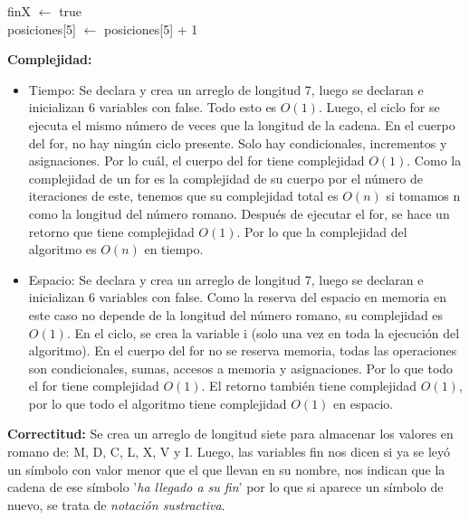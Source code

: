 \documentclass[12pt]{article}
\begin{document}
\begin{itemize}
\begin{algorithm}[H]
{{{{                }{
                    finX $\gets$ true \\
                    posiciones[5] $\gets$ posiciones[5] + 1 \\
                }
            }
        }
    }
    \end{algorithm}
    \textbf{Complejidad:}
    \begin{itemize}
        \item Tiempo: Se declara y crea un arreglo de longitud 7, luego se declaran e inicializan 6 variables con false. Todo esto es $O(1)$.
        Luego, el ciclo for se ejecuta el mismo número de veces que
        la longitud de la cadena. En el cuerpo del for, no hay ningún ciclo presente. Solo hay condicionales, incrementos y asignaciones. Por lo cuál, el cuerpo del for tiene complejidad $O(1)$. Como la complejidad de un for es la complejidad de su cuerpo por el número de iteraciones de este, tenemos que su complejidad total es $O(n)$ si tomamos n como la longitud del número romano. Después de ejecutar el for, se hace un retorno que tiene complejidad $O(1)$. Por lo que la complejidad del algoritmo es $O(n)$ en tiempo.
        \item Espacio: Se declara y crea un arreglo de longitud 7, luego se declaran e inicializan 6 variables con false. Como la reserva del espacio en memoria en este caso no depende de la longitud del número romano, su complejidad es $O(1)$.
        En el ciclo, se crea la variable i (solo una vez en toda la ejecución del algoritmo). En el cuerpo del for no se reserva memoria, todas las operaciones son condicionales, sumas, accesos a memoria y asignaciones. Por lo que todo el for tiene complejidad $O(1)$. El retorno también tiene complejidad $O(1)$, por lo que todo el algoritmo tiene complejidad $O(1)$ en espacio.
    \end{itemize}
    \textbf{Correctitud:} Se crea un arreglo de longitud siete para almacenar los valores en romano de: M, D, C, L, X, V y I.
    Luego, las variables fin nos dicen si ya se leyó un símbolo con valor menor que el que llevan en su nombre, nos indican que la cadena de ese símbolo '\textit{ha llegado a su fin}' por lo que si aparece un símbolo de nuevo, se trata de \textit{notación sustractiva}.


\end{itemize}
\end{document}
